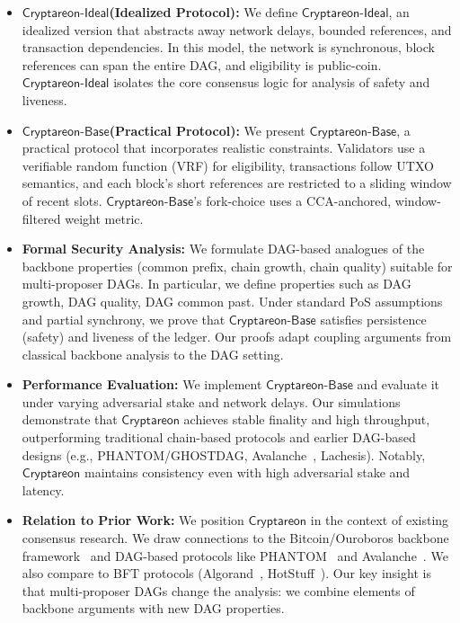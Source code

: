 \documentclass[11pt]{article}
\newcommand{\Proj}{\ensuremath{\mathsf{Cryptareon}}\xspace}
\newcommand{\ProjIdeal}{\ensuremath{\mathsf{Cryptareon\text{-}Ideal}}\xspace}
\newcommand{\ProjBase}{\ensuremath{\mathsf{Cryptareon\text{-}Base}}\xspace}
\begin{document}
\begin{itemize}
\item {\bf \ProjIdeal (Idealized Protocol):} We define \ProjIdeal, an idealized version that abstracts away network delays, bounded references, and transaction dependencies. In this model, the network is synchronous, block references can span the entire DAG, and eligibility is public-coin. \ProjIdeal isolates the core consensus logic for analysis of safety and liveness. 
\item {\bf \ProjBase (Practical Protocol):} We present \ProjBase, a practical protocol that incorporates realistic constraints. Validators use a verifiable random function (VRF) for eligibility, transactions follow UTXO semantics, and each block's short references are restricted to a sliding window of recent slots. %
\ProjBase's fork-choice uses a CCA-anchored, window-filtered weight metric.
\item {\bf Formal Security Analysis:} We formulate DAG-based analogues of the backbone properties (common prefix, chain growth, chain quality) suitable for multi-proposer DAGs. In particular, we define properties such as DAG growth, DAG quality, DAG common past. %
Under standard PoS assumptions and partial synchrony, we prove that \ProjBase satisfies persistence (safety) and liveness of the ledger. Our proofs adapt coupling arguments from classical backbone analysis to the DAG setting.
\item {\bf Performance Evaluation:} We implement \ProjBase and evaluate it under varying adversarial stake and network delays. Our simulations demonstrate that \Proj achieves stable finality and high throughput, outperforming traditional chain-based protocols and earlier DAG-based designs (e.g., PHANTOM/GHOSTDAG, Avalanche~\cite{SnowFamily}, Lachesis). Notably, \Proj maintains consistency even with high adversarial stake and latency.
\item {\bf Relation to Prior Work:} We position \Proj in the context of existing consensus research. We draw connections to the Bitcoin/Ouroboros backbone framework~\cite{EC:GarKiaLeo15,EC:PasSeeShe17} and DAG-based protocols like PHANTOM~\cite{AFT:SWZ21} and Avalanche~\cite{SnowFamily}. We also compare to BFT protocols (Algorand~\cite{Algorand}, HotStuff~\cite{HotStuff}). Our key insight is that multi-proposer DAGs change the analysis: we combine elements of backbone arguments with new DAG properties. 
\end{itemize}
\end{document}

